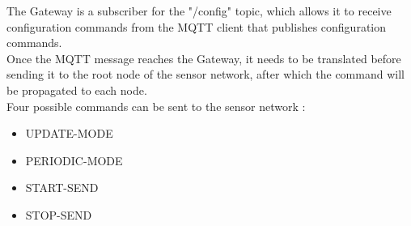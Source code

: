 \documentclass[a4paper,11pt]{article}
\begin{document}
The Gateway is a subscriber for the "/config" topic, which allows it to receive configuration commands from the MQTT client that publishes configuration commands.\\

Once the MQTT message reaches the Gateway, it needs to be translated before sending it to the root node of the sensor network, after which the command will be propagated to each node.\\

Four possible commands can be sent to the sensor network :
\begin{itemize}
\item{UPDATE-MODE}
\item{PERIODIC-MODE}
\item{START-SEND}
\item{STOP-SEND}
\end{itemize}
\end{document}
